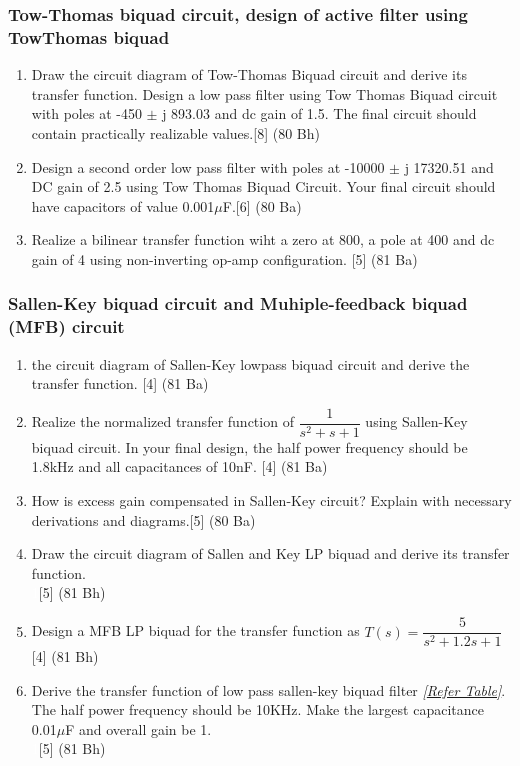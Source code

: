 \documentclass[12pt]{article}
\newcommand{\enter}{\\\textcolor{white}{1}}
\begin{document}
\subsubsection{Tow-Thomas biquad circuit, design of active filter using TowThomas biquad}
\begin{enumerate}
\item Draw the circuit diagram of Tow-Thomas Biquad circuit and derive its transfer function. Design a low pass filter using Tow Thomas Biquad circuit with poles at -450 $\pm$ j 893.03 and dc gain of 1.5. The final circuit should contain practically realizable values.\hfill [8] (80 Bh)
\item Design a second order low pass filter with poles at -10000 $\pm$ j 17320.51 and DC gain of 2.5 using Tow Thomas Biquad Circuit. Your final circuit should have capacitors of value 0.001$\mu$F.\hfill [6] (80 Ba)

	\item Realize a bilinear transfer function wiht a zero at 800, a pole at 400 and dc gain of 4 using non-inverting op-amp configuration. \hfill [5] (81 Ba)
\end{enumerate}
\subsubsection{Sallen-Key biquad circuit and Muhiple-feedback biquad (MFB) circuit}
\begin{enumerate}
	\item the circuit diagram of Sallen-Key lowpass biquad circuit and derive the transfer function. \hfill [4] (81 Ba)
	
	\item Realize the normalized transfer function of $\dfrac{1}{s^2+s+1}$ using Sallen-Key biquad circuit. In your final design, the half power frequency should be 1.8kHz and all capacitances of 10nF. \hfill [4] (81 Ba)
	
\item How is excess gain compensated in Sallen-Key circuit? Explain with necessary derivations and diagrams.\hfill[5] (80 Ba)
\item Draw the circuit diagram of Sallen and Key LP biquad and derive its transfer function.
\enter\hfill [5] (81 Bh)
\item Design a MFB LP biquad for the transfer function as $T(s) = \dfrac{5}{s^2+1.2s+1}$ \hfill [4] (81 Bh)

\item Derive the transfer function of low pass sallen-key biquad filter \textit{[\hyperref[sec:tables_81ba]{Refer Table]}}. The half power frequency should be 10KHz. Make the largest capacitance 0.01$\mu$F and overall gain be 1.
\enter \hfill [5] (81 Bh)
\end{enumerate}
\end{document}
